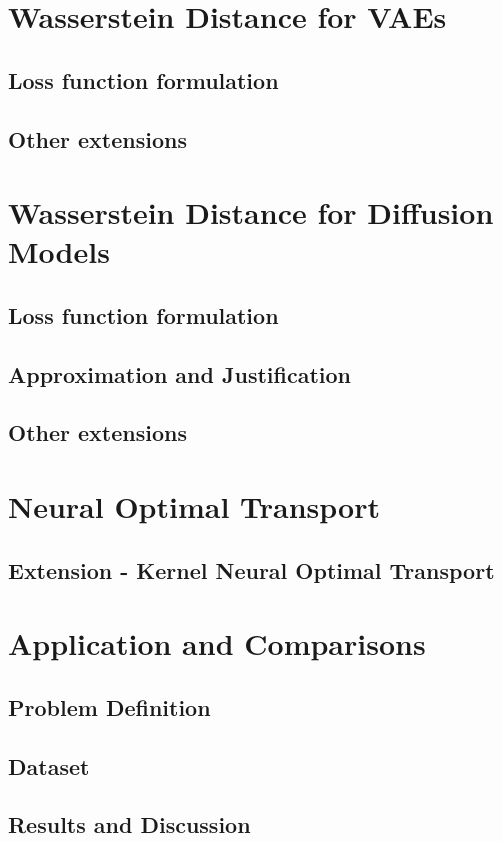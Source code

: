 \documentclass{article}
\begin{document}
\section{Wasserstein Distance for VAEs}
\subsection{Loss function formulation}
\subsection{Other extensions}
\section{Wasserstein Distance for Diffusion Models}

\subsection{Loss function formulation}
\subsection{Approximation and Justification}
\subsection{Other extensions}
\section{Neural Optimal Transport}
\subsection{Extension - Kernel Neural Optimal Transport}
\section{Application and Comparisons}
\subsection{Problem Definition}
\subsection{Dataset}
\subsection{Results and Discussion}
\end{document}
